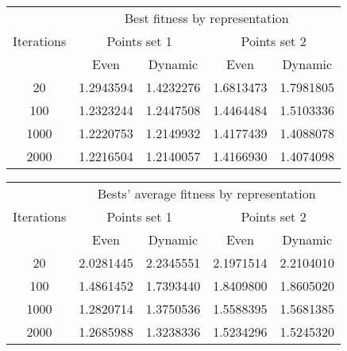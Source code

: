 \begin{center}
	\begin{tabular}{|c|c|c|c|c|}
		\hline
		\multirow{3}{*}{Iterations}	&	\multicolumn{4}{c|}{Best fitness by representation}																													\\
										\cline{2-5}
									&	\multicolumn{2}{c|}{Points set 1}												& \multicolumn{2}{c|}{Points set 2}													\\
										\cline{2-5}
									&	Even								&	Dynamic									&	Even									&	Dynamic								\\
		\hline								
		20							& 1.2943594 \cellcolor[gray]{0.9}		& 1.4232276									& 1.6813473 \cellcolor[gray]{0.9}			& 1.7981805								\\
		\hline
		100							& 1.2323244	\cellcolor[gray]{0.9}		& 1.2447508									& 1.4464484	\cellcolor[gray]{0.9}			& 1.5103336								\\
		\hline
		1000						& 1.2220753 							& 1.2149932 \cellcolor[gray]{0.9}			& 1.4177439									& 1.4088078 \cellcolor[gray]{0.9}		\\
		\hline
		2000						& 1.2216504					 			& 1.2140057 \cellcolor[gray]{0.9}			& 1.4166930									& 1.4074098	\cellcolor[gray]{0.9}		\\
		\hline
	\end{tabular}
	\label{tab:representation_type_best}
\end{center}

\begin{center}
	\begin{tabular}{|c|c|c|c|c|}
		\hline
		\multirow{3}{*}{Iterations}	&	\multicolumn{4}{c|}{Bests' average fitness by representation}																\\
										\cline{2-5}
									&	\multicolumn{2}{c|}{Points set 1}							& \multicolumn{2}{c|}{Points set 2}								\\
										\cline{2-5}
									&	Even			&	Dynamic			&	Even				&	Dynamic														\\
	\hline								
	20								&	2.0281445 \cellcolor[gray]{0.9}		&	2.2345551			&	2.1971514 \cellcolor[gray]{0.9} 		&	2.2104010		\\
	\hline
	100								&	1.4861452 \cellcolor[gray]{0.9}		&	1.7393440			&	1.8409800 \cellcolor[gray]{0.9}			&	1.8605020		\\
	\hline
	1000 							&	1.2820714 \cellcolor[gray]{0.9} 	&	1.3750536			&	1.5588395 \cellcolor[gray]{0.9}			&	1.5681385		\\
	\hline
	2000							&	1.2685988 \cellcolor[gray]{0.9} 	&	1.3238336			&	1.5234296 \cellcolor[gray]{0.9}			&	1.5245320		\\
	\hline
	\end{tabular}
	\label{tab:representation_type_best_avg}
\end{center}

